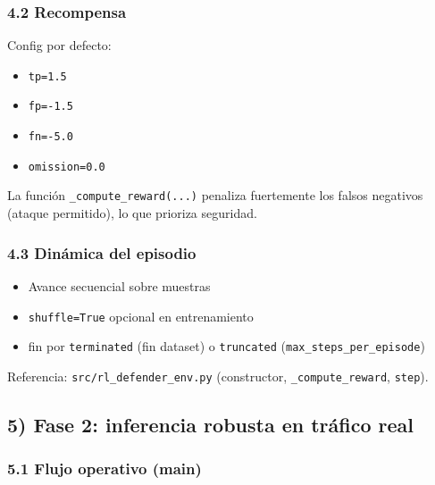 ﻿\documentclass[12pt,a4paper]{article}
\begin{document}
\subsubsection{4.2 Recompensa}

Config por defecto:

\begin{itemize}
  \item \texttt{tp=1.5}
  \item \texttt{fp=-1.5}
  \item \texttt{fn=-5.0}
  \item \texttt{omission=0.0}
\end{itemize}

La función \verb|_compute_reward(...)| penaliza fuertemente los falsos negativos (ataque permitido),
lo que prioriza seguridad.

\subsubsection{4.3 Dinámica del episodio}

\begin{itemize}
  \item Avance secuencial sobre muestras
  \item \texttt{shuffle=True} opcional en entrenamiento
  \item fin por \texttt{terminated} (fin dataset) o \texttt{truncated}
        (\texttt{max\_steps\_per\_episode})
\end{itemize}

Referencia: \verb|src/rl_defender_env.py| (constructor, \verb|_compute_reward|, \texttt{step}).

\subsection{5) Fase 2: inferencia robusta en tráfico real}

\subsubsection{5.1 Flujo operativo (main)}
\end{document}
